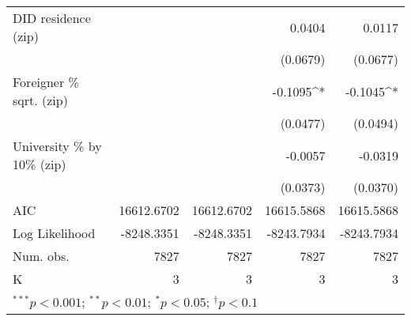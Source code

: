 \begin{tabular}{l D{.}{.}{5.11} D{.}{.}{5.7} D{.}{.}{5.11} D{.}{.}{5.7}}
DID residence (zip)               &                  &               & 0.0404           & 0.0117        \\
                                  &                  &               & (0.0679)         & (0.0677)      \\
Foreigner \% sqrt. (zip)          &                  &               & -0.1095^{*}      & -0.1045^{*}   \\
                                  &                  &               & (0.0477)         & (0.0494)      \\
University \% by 10\% (zip)       &                  &               & -0.0057          & -0.0319       \\
                                  &                  &               & (0.0373)         & (0.0370)      \\
\midrule
AIC                               & 16612.6702       & 16612.6702    & 16615.5868       & 16615.5868    \\
Log Likelihood                    & -8248.3351       & -8248.3351    & -8243.7934       & -8243.7934    \\
Num. obs.                         & 7827             & 7827          & 7827             & 7827          \\
K                                 & 3                & 3             & 3                & 3             \\
\bottomrule
{}
\end{tabular}
